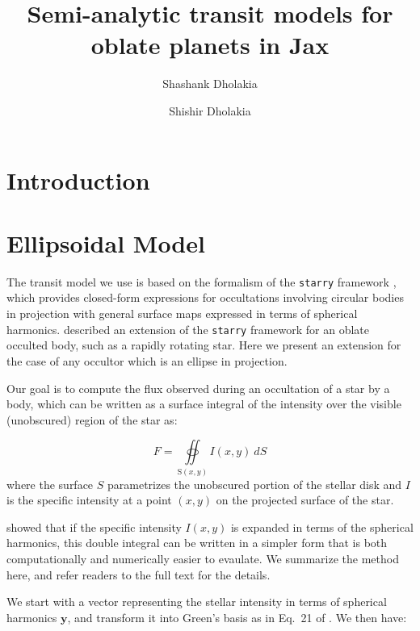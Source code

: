 \documentclass[twocolumn]{aastex631}
\begin{document}
\title{Semi-analytic transit models for oblate planets in Jax}

\author{Shashank Dholakia} \author{Shishir Dholakia}

\begin{abstract}

\end{abstract}

\section{Introduction}
\label{sec:intro}


\section{Ellipsoidal Model}
\label{sec:model}
The transit model we use is based on the formalism of the \texttt{starry} framework \citep{starry2019}, which provides closed-form expressions for occultations involving circular bodies in projection with general surface maps expressed in terms of spherical harmonics. \citet{dholakia2022} described an extension of the \texttt{starry} framework for an oblate occulted body, such as a rapidly rotating star. Here we present an extension for the case of any occultor which is an ellipse in projection. 

Our goal is to compute the flux observed during an occultation of a star by a body, which can be written as a surface integral of the intensity over the visible (unobscured) region of the star as:

\begin{equation}
   F = \oiint\limits_{\mathrm{S}(x,y)} I(x,y) \ dS
\end{equation}
where the surface $S$ parametrizes the unobscured portion of the stellar disk and $I$ is the specific intensity at a point $(x,y)$ on the projected surface of the star. 

\citet{starry2019} showed that if the specific intensity $I(x,y)$ is expanded in terms of the spherical harmonics, this double integral can be written in a simpler form that is both computationally and numerically easier to evaulate. We summarize the method here, and refer readers to the full text for the details. 

We start with a vector representing the stellar intensity in terms of spherical harmonics $\mathbf{y}$, and transform it into Green's basis as in Eq.~21 of \citet{starry2019}. We then have: 
\end{document}
